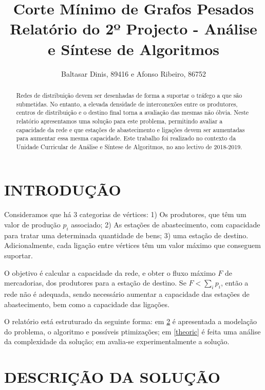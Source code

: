 \documentclass[a4paper, 12pt, conference, portuguese]{ieeeconf}
\title{{\LARGE \bf Corte Mínimo de Grafos Pesados\\}
\large{Relatório do 2º Projecto - Análise e Síntese de Algoritmos} }
\author{Baltasar Dinis, 89416 e Afonso Ribeiro, 86752}
\begin{document}
\newtheorem{theorem}{Teorema}
\theoremstyle{definition}
\newtheorem{axiom}{Axioma}[section]
\newtheorem{corollary}{Corolário}
\newtheorem{lemma}{Lema}
\newtheorem{defin}{Definição}
\newtheorem*{dem}{Demonstração}

\maketitle
\thispagestyle{empty}
\pagestyle{empty}

\begin{abstract}
  Redes de distribuição devem ser desenhadas de forma a
  suportar o tráfego a que são submetidas. No entanto, a
  elevada densidade de interconexões entre os produtores,
  centros de distribuição e o destino final torna a avaliação das
  mesmas não óbvia. Neste relatório apresentamos uma solução
  para este problema, permitindo avaliar a capacidade da rede e
  que estações de abastecimento e ligações devem ser aumentadas
  para aumentar essa mesma capacidade. Este trabalho foi
  realizado no contexto da Unidade Curricular de Análise e Síntese
  de Algoritmos, no ano lectivo de 2018-2019.
\end{abstract}

\section{INTRODUÇÃO}\label{intro}

Consideramos que há $3$ categorias de vértices: 1) Os produtores,
que têm um valor de produção $p_i$ associado; 2) As
estações de abastecimento, com capacidade para tratar
uma determinada quantidade de bens; 3) uma estação de destino.
Adicionalmente, cada ligação entre vértices têm um valor máximo
que conseguem suportar.

O objetivo é calcular a capacidade da rede, e obter o fluxo
máximo $F$ de mercadorias, dos produtores para a estação de
destino. Se $F < \sum_i p_i$, então a rede não é adequada, sendo
necessário aumentar a capacidade das estações de abastecimento,
bem como a capacidade das ligações.

O relatório está estruturado da seguinte forma: em \ref{sol} é
apresentada a modelação do problema, o algoritmo e possíveis
ptimizações; em \ref{theoric} é feita uma análise da
complexidade da solução; em \label{experimental} avalia-se
experimentalmente a solução.

\section{DESCRIÇÃO DA SOLUÇÃO}\label{sol}
\end{document}
